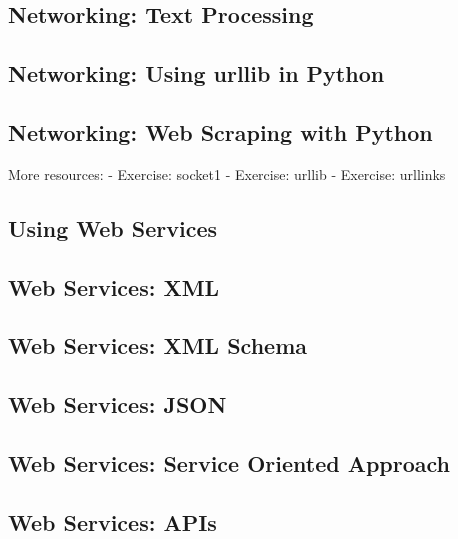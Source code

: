 \documentclass{article}%
\begin{document}
%
\subsection{Networking: Text Processing}%
\label{subsec:NetworkingTextProcessing}%

%
\subsection{Networking: Using urllib in Python}%
\label{subsec:NetworkingUsingurllibinPython}%

%
\subsection{Networking: Web Scraping with Python}%
\label{subsec:NetworkingWebScrapingwithPython}%
More resources:\newline%
{-} Exercise: socket1\newline%
{-} Exercise: urllib\newline%
{-} Exercise: urllinks\newline%

%
\subsection{Using Web Services}%
\label{subsec:UsingWebServices}%

%
\subsection{Web Services: XML}%
\label{subsec:WebServicesXML}%

%
\subsection{Web Services: XML Schema}%
\label{subsec:WebServicesXMLSchema}%

%
\subsection{Web Services: JSON}%
\label{subsec:WebServicesJSON}%

%
\subsection{Web Services: Service Oriented Approach}%
\label{subsec:WebServicesServiceOrientedApproach}%

%
\subsection{Web Services: APIs}%
\label{subsec:WebServicesAPIs}%
\end{document}
